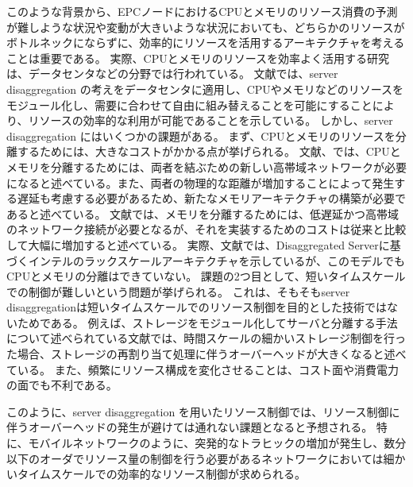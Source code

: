 \documentclass[a4j]{ujarticle}
\begin{document}
このような背景から、EPCノードにおけるCPUとメモリのリソース消費の予測が難しような状況や変動が大きいような状況においても、どちらかのリソースがボトルネックにならずに、効率的にリソースを活用するアーキテクチャを考えることは重要である。
実際、CPUとメモリのリソースを効率よく活用する研究は、データセンタなどの分野では行われている。
文献\cite{TechnoEconomicFrameworkforCloudInfrastructureACostStudyofResourceDisaggregation}では、server disaggregation の考えをデータセンタに適用し、CPUやメモリなどのリソースをモジュール化し、需要に合わせて自由に組み替えることを可能にすることにより、リソースの効率的な利用が可能であることを示している。
しかし、server disaggregation にはいくつかの課題がある。
まず、CPUとメモリのリソースを分離するためには、大きなコストがかかる点が挙げられる。
文献\cite{IntelsDisaggregatedServerRack}、\cite{EnhancedBackoffTimerSolutionforGTPCOverloadControl}では、CPUとメモリを分離するためには、両者を結ぶための新しい高帯域ネットワークが必要になると述べている。また、両者の物理的な距離が増加することによって発生する遅延も考慮する必要があるため、新たなメモリアーキテクチャの構築が必要であると述べている。
文献\cite{DisaggregatedandOpticallyInterconnectedMemoryWhenwillitbecosteffective}では、メモリを分離するためには、低遅延かつ高帯域のネットワーク接続が必要となるが、それを実装するためのコストは従来と比較して大幅に増加すると述べている。
実際、文献\cite{DisaggregatedServersDriveDataCenterEfficiencyandInnovation}では、Disaggregated Serverに基づくインテルのラックスケールアーキテクチャを示しているが、このモデルでもCPUとメモリの分離はできていない。
課題の2つ目として、短いタイムスケールでの制御が難しいという問題が挙げられる。
これは、そもそもserver disaggregationは短いタイムスケールでのリソース制御を目的とした技術ではないためである。
例えば、ストレージをモジュール化してサーバと分離する手法について述べられている文献\cite{UnderstandingRackScaleDisaggregatedStorage}では、時間スケールの細かいストレージ制御を行った場合、ストレージの再割り当て処理に伴うオーバーヘッドが大きくなると述べている。
また、頻繁にリソース構成を変化させることは、コスト面や消費電力の面でも不利である。

このように、server disaggregation を用いたリソース制御では、リソース制御に伴うオーバーヘッドの発生が避けては通れない課題となると予想される。
特に、モバイルネットワークのように、突発的なトラヒックの増加が発生し、数分以下のオーダでリソース量の制御を行う必要があるネットワークにおいては細かいタイムスケールでの効率的なリソース制御が求められる。
\end{document}
